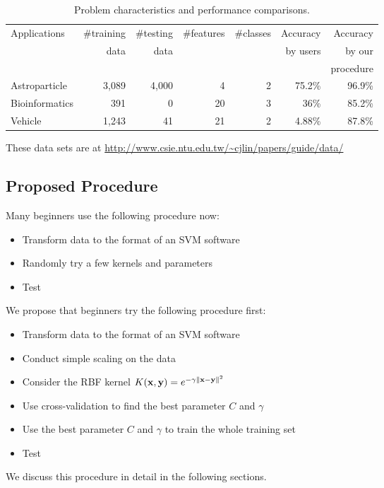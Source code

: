 \documentclass[12pt]{article}
\def\bx{{\bf x}}
\def\by{{\bf y}}
\begin{document}
\begin{table}
\caption{Problem characteristics and performance comparisons.}
\label{accuracy}
\begin{center}
\begin{tabular}{@{}l|r|r|r|r|r|r@{}}
Applications&\#training&\#testing&\#features&\#classes&Accuracy&Accuracy \\
                &data      &data     &          &       &by users&by our   \\
                &          &         &          &       &        &procedure\\
\hline
Astroparticle\footnotemark[1] & 3,089 & 4,000 & 4 & 2 & 75.2\% & 96.9\% \\
Bioinformatics\footnotemark[2] & 391 & 0\footnotemark[4] & 20 & 3 & 36\% & 85.2\% \\
Vehicle\footnotemark[3] & 1,243 & 41 & 21 & 2 & 4.88\% & 87.8\%
\end{tabular}
\end{center}
\end{table}


These data sets are at \url{http://www.csie.ntu.edu.tw/~cjlin/papers/guide/data/}

\subsection{Proposed Procedure}

Many beginners use the following procedure now:
\begin{itemize}
\item Transform data to the format of an SVM software
\item Randomly try a few kernels and parameters
\item Test
\end{itemize}
We propose that beginners try the following procedure first:
\begin{itemize}
\item Transform data to the format of an SVM software
\item Conduct simple scaling on the data
\item Consider the RBF kernel $K(\bx,\by)=e^{-\gamma\|\bx-\by\|^2}$ 
\item Use cross-validation to find the best parameter
      $C$ and $\gamma$
\item Use the best parameter $C$ and $\gamma$ to train the 
whole training set\footnotemark[5]
\item Test
\end{itemize}
We discuss this procedure in detail in the following 
sections.
\end{document}
